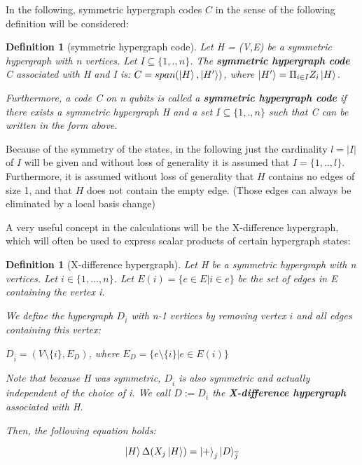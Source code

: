 \documentclass[12pt]{iopart}
\newtheorem{definition}[lemma]{Definition}
\begin{document}
In the following, symmetric hypergraph codes $C$ in the sense of the following definition will be considered:

\begin{definition}[symmetric hypergraph code]
\label{DefinitionSymmetricHypergraphCode}
Let H = (V,E) be a symmetric hypergraph with n vertices. Let  $I \subseteq \{1,.,n\}$. 
The \textbf{symmetric hypergraph code} C associated with H and I is:
$C = span(\ket{H},\ket{H^\prime})$, where $\ket{H^\prime} = \Pi_{i \in I}Z_i\ket{H}$.

Furthermore, a code C on n qubits is called a \textbf{symmetric hypergraph code} if there exists a symmetric hypergraph H and a set $I \subseteq \{1,.,n\}$ such that C can be written in the form above.
\end{definition}

Because of the symmetry of the states, in the following just the cardinality $l = |I|$ of $I$ will be given and without loss of generality it is assumed that $I = \{1,..,l\}$. Furthermore, it is assumed without loss of generality that $H$ contains no edges of size 1, and that $H$ does not contain the empty edge. (Those edges can always be eliminated by a local basis change)

A very useful concept in the calculations will be the X-difference hypergraph, which will often be used to express scalar products of certain hypergraph states:

\begin{definition}[X-difference hypergraph]
\label{DefinitionX-differenceHypergaph}
Let H be a symmetric hypergraph with n vertices. Let $i \in \{1,...,n\}$.
Let $E(i) = \{e\in E| i \in e\}$ be the set of edges in E containing the vertex i.

We define the hypergraph $D_{\overline{i}}$ with n-1 vertices by removing vertex $i$ and all edges containing this vertex:

$D_{\overline{i}} = (V\setminus \{i\},E_D)$, where $E_D = \{e\setminus \{i\}|e \in E(i)\}$

Note that because H was symmetric, $D_{\overline{i}}$ is also symmetric and actually independent of the choice of i.
We call $D := D_{\overline{i}}$ the \textbf{X-difference hypergraph} associated with H.

Then, the following equation holds:

\begin{equation}
\ket{H} \Delta (X_j\ket{H}) = \ket{+}_j\ket{D}_{\overline{j}}
\label{Xdifference}
\end{equation}
\end{definition}
\end{document}
